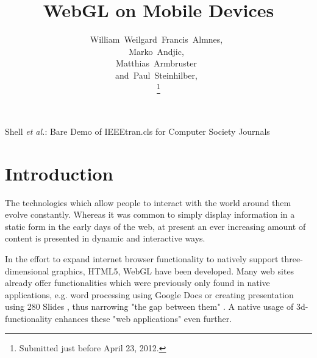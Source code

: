 \documentclass[12pt,journal,compsoc]{IEEEtran}
\begin{document}
\title{WebGL on Mobile Devices}


\author{William~Weilgard~Francis~Almnes,~\\
        Marko~Andjic,~\\
        Matthias~Armbruster~\\  
        and~Paul~Steinhilber,~%

\thanks{Submitted just before April 23, 2012.}}


%
{Shell \MakeLowercase{\textit{et al.}}: Bare Demo of IEEEtran.cls for Computer Society Journals}



\maketitle

\IEEEdisplaynotcompsoctitleabstractindextext
\IEEEpeerreviewmaketitle


\section{Introduction}
The technologies which allow people to interact with the world around them evolve constantly. Whereas it was common to simply display information in a static form in the early days of the web, at present an ever increasing amount of content is presented in dynamic and interactive ways.

In the effort to expand internet browser functionality to natively support three-dimensional graphics, HTML5, WebGL have been developed. Many web sites already offer functionalities which were previously only found in native applications, e.g. word processing using Google Docs \cite{googledocs} or creating presentation using 280 Slides \cite{280slides}, thus narrowing "the gap between them" \cite{Golubovic2011}. A native usage of 3d-functionality enhances these "web applications" even further.
\end{document}
